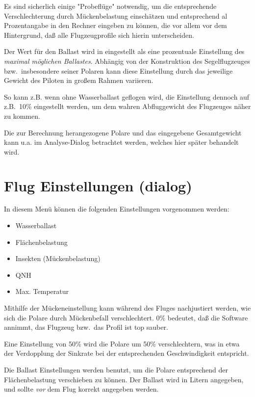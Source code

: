Es sind sicherlich einige "Probeflüge" notwendig, um die entsprechende Verschlechterung durch Mückenbelastung einschätzen
und entsprechend al Prozentangabe in den Rechner eingeben zu können, die vor allem vor dem Hintergrund,
daß alle Flugzeugprofile sich hierin unterscheiden.

Der Wert für den Ballast  wird in \xc eingestellt als eine prozentuale Einstellung des \textsl{maximal möglichen Ballastes}.
Abhängig von der Konstruktion des Segelflugzeuges bzw.\ insbesondere seiner Polaren kann diese Einstellung  durch das
jeweilige Gewicht des Piloten in großem Rahmen variieren.

So kann z.B. wenn ohne Wasserballast geflogen wird, die Einstellung dennoch auf z.B.\ 10\% eingestellt werden,
um dem wahren Abfluggewicht des Flugzeuges näher zu kommen.



Die zur Berechnung herangezogene Polare und das eingegebene Gesamtgewicht kann
u.a. im Analyse-Dialog betrachtet werden, welches hier später behandelt wird.

\section{Flug Einstellungen (dialog)}\label{sec:basic-sett-dial}
In diesem Menü können die folgenden Einstellungen vorgenommen werden:


\begin{itemize}
\item Wasserballast
\item Flächenbelastung
\item Insekten (Mückenbelastung)
\item QNH
\item Max. Temperatur
\end{itemize}

Mithilfe der Mückeneinstellung kann während des Fluges \achtung nachjustiert werden, wie sich die Polare
durch Mückenbefall verschlechtert.  0\% bedeutet, daß die Software annimmt, das Flugzeug bzw.\ 
das Profil ist top sauber. 

Eine Einstellung von 50\%  wird die Polare um 50\% verschlechtern, was in etwa der Verdopplung
der Sinkrate bei der entsprechenden Geschwindigkeit entspricht.

 Die Ballast Einstellungen werden benutzt, um  die Polare entsprechend der Flächenbelastung verschieben zu können. Der Ballast wird in Litern angegeben, und sollte \emph{vor} dem Flug
korrekt angegeben werden.


